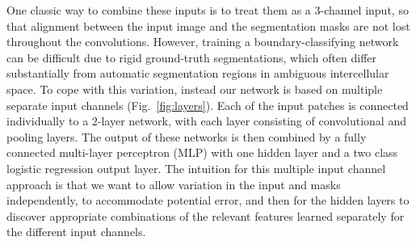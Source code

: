 One classic way to combine these inputs is to treat them as a 3-channel input, so that alignment between the input image and the segmentation masks are not lost throughout the convolutions. However, training a boundary-classifying network can be difficult due to rigid ground-truth segmentations, which often differ substantially from automatic segmentation regions in ambiguous intercellular space. To cope with this variation, instead our network is based on multiple separate input channels (Fig.~\ref{fig:layers}). Each of the input patches is connected individually to a 2-layer network, with each layer consisting of convolutional and pooling layers. The output of these networks is then combined by a fully connected multi-layer perceptron (MLP) with one hidden layer and a two class logistic regression output layer. The intuition for this multiple input channel approach is that we want to allow variation in the input and masks independently, to accommodate potential error, and then for the hidden layers to discover appropriate combinations of the relevant features learned separately for the different input channels.


